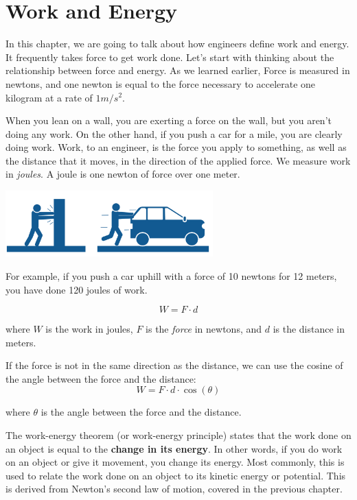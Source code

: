 \chapter{Work and Energy}

In this chapter, we are going to talk about how engineers define work
and energy. It frequently takes force to get work done. Let's start with thinking about the relationship between force and energy. As we learned earlier, Force is measured in
newtons, and one newton is equal to the force necessary to accelerate one
kilogram at a rate of $1 m/s^2$.

When you lean on a wall, you are exerting a force on the wall, but you
aren't doing any work. On the other hand, if you push a car for a mile,
you are clearly doing work. Work, to an engineer, is the force you
apply to something, as well as the distance that it moves, in the direction
of the applied force. We measure work in \textit{joules}. A joule is one
newton of force over one meter.

\includegraphics[width=0.6\textwidth]{workvsforce.png}

For example, if you push a car uphill with a force of 10 newtons for 12
meters, you have done 120 joules of work.

\begin{mdframed}[style=important, frametitle={Formula for Work}]
\[
W = F \cdot d
\]

where $W$ is the work in joules, $F$ is the \textit{force} in newtons, and $d$ is the distance in meters.

If the force is not in the same direction as the distance, we can use the cosine of the angle between the force and the distance:
\[
W = F \cdot d \cdot \cos(\theta)
\]

where $\theta$ is the angle between the force and the distance.
\end{mdframed}

The work-energy theorem (or work-energy principle) states that the work done on an object is equal to the \textbf{change in its energy}. In other words, if you do work on an object or give it movement, you change its energy. Most commonly, this is used to relate the work done on an object to its kinetic energy or potential. This is derived from Newton's second law of motion, covered in the previous chapter. %

